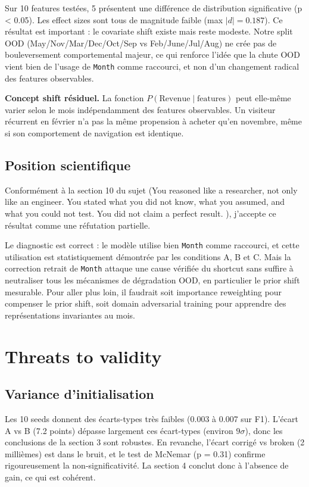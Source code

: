 \documentclass[11pt,a4paper]{article}
\newcommand{\code}[1]{\texttt{\small#1}}
\begin{document}
Sur 10 features testées, 5 présentent une différence de distribution significative (p < 0.05). Les effect sizes sont tous de magnitude faible (max $|d| = 0.187$). Ce résultat est important : le covariate shift existe mais reste modeste. Notre split OOD (May/Nov/Mar/Dec/Oct/Sep vs Feb/June/Jul/Aug) ne crée pas de bouleversement comportemental majeur, ce qui renforce l'idée que la chute OOD vient bien de l'usage de \code{Month} comme raccourci, et non d'un changement radical des features observables.

\textbf{Concept shift résiduel.} La fonction $P(\text{Revenue} \mid \text{features})$ peut elle-même varier selon le mois indépendamment des features observables. Un visiteur récurrent en février n'a pas la même propension à acheter qu'en novembre, même si son comportement de navigation est identique.

\subsection*{Position scientifique}

Conformément à la section 10 du sujet (\og You reasoned like a researcher, not only like an engineer. You stated what you did not know, what you assumed, and what you could not test. You did not claim a perfect result. \fg{}), j'accepte ce résultat comme une réfutation partielle.

Le diagnostic est correct : le modèle utilise bien \code{Month} comme raccourci, et cette utilisation est statistiquement démontrée par les conditions A, B et C. Mais la correction \og retrait de \code{Month} \fg{} attaque une cause vérifiée du shortcut sans suffire à neutraliser tous les mécanismes de dégradation OOD, en particulier le prior shift mesurable. Pour aller plus loin, il faudrait soit importance reweighting pour compenser le prior shift, soit domain adversarial training pour apprendre des représentations invariantes au mois.

\section{Threats to validity}

\subsection*{Variance d'initialisation}

Les 10 seeds donnent des écarts-types très faibles (0.003 à 0.007 sur F1). L'écart A vs B (7.2 points) dépasse largement ces écart-types (environ $9\sigma$), donc les conclusions de la section 3 sont robustes. En revanche, l'écart corrigé vs broken (2 millièmes) est dans le bruit, et le test de McNemar (p = 0.31) confirme rigoureusement la non-significativité. La section 4 conclut donc à l'absence de gain, ce qui est cohérent.
\end{document}
